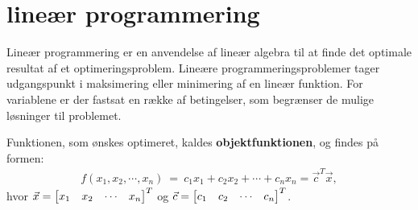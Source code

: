 \chapter{lineær programmering}

\begin{comment}
Ting til retter
- bør "def 5.5 mulige løsninger og den mulige mængde" komme før "standard maksimums- og minimumsproblemer"? %
- Jeg er ikke sikker på alle termer i dette afsnit. Jeg rettede kriteriefunktion til objektfunktion, da der blev brugt objektfunktion i projektforslaget.
- Jeg er lidt inkonsistent med anvendelsen af [1 2 3] og [1,2,3]. er ikke helt sikker på hvad der ser bedst ud. %
- Er der brug for at skrive betingelserne og objektfunktionen ud i starten, eller er det nok at det skrives som vektor-vektor produkt?
\end{comment}

Lineær programmering er en anvendelse af lineær algebra til at finde det optimale resultat af et optimeringsproblem. Lineære programmeringsproblemer tager udgangspunkt i maksimering eller minimering af en lineær funktion. For variablene er der fastsat en række af betingelser, som begrænser de mulige løsninger til problemet.


Funktionen, som ønskes optimeret, kaldes \textbf{objektfunktionen}, og findes på formen:
\begin{align}
f(x_1,x_2,\cdots , x_n)\ =\ c_1x_1 + c_2x_2 + \cdots + c_nx_n = \vec{c}^T \vec{x},
\end{align}
hvor $\vec{x}= \begin{bmatrix} x_1 & x_2 & \cdots & x_n \end{bmatrix}^T$ og $\vec{c}= \begin{bmatrix} c_1 & c_2 & \cdots & c_n \end{bmatrix}^T$.
\begin{comment}
Bør muligvis være en defintion, behøver ikke at skrives ud, men så skal f(\vec{x}) frem for f(x_1, ..., x_n).  Men det er jo variable repræcenteret ved en vektor så måske introducerer f(x_1, ..., x_n), udenfor definitionen.
\begin{defn}
Betragt et lineært programmerings problem, da er \textbf{objektfunktionen}
\begin{align*}
f(\vec{x}) = \vec{c}^T \cdot \vec{x}, 
\end{align*}
for $\vec{x}, \vec{c} \in \mathds{R}^n$, funktionen, som ønskes optimeret.
\end{defn} Eller noget, det er vigtigt at denne definition, vil kræve at vektor x og c bliver introduceret i den bindende tekst.
\end{comment}



